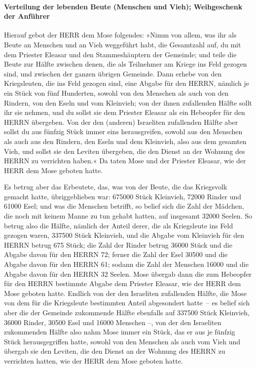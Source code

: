 \hypertarget{verteilung-der-lebenden-beute-menschen-und-vieh-weihgeschenk-der-anfuxfchrer}{%
\paragraph{Verteilung der lebenden Beute (Menschen und Vieh);
Weihgeschenk der
Anführer}\label{verteilung-der-lebenden-beute-menschen-und-vieh-weihgeschenk-der-anfuxfchrer}}

Hierauf gebot der HERR dem Mose folgendes:
»Nimm von allem, was ihr als Beute an Menschen und an
Vieh weggeführt habt, die Gesamtzahl auf, du mit dem Priester Eleasar
und den Stammeshäuptern der Gemeinde; und teile die Beute
zur Hälfte zwischen denen, die als Teilnehmer am Kriege ins Feld gezogen
sind, und zwischen der ganzen übrigen Gemeinde. Dann
erhebe von den Kriegsleuten, die ins Feld gezogen sind, eine Abgabe für
den HERRN, nämlich je ein Stück von fünf Hunderten, sowohl von den
Menschen als auch von den Rindern, von den Eseln und vom Kleinvieh;
von der ihnen zufallenden Hälfte sollt ihr sie nehmen,
und du sollst sie dem Priester Eleasar als ein Hebeopfer für den HERRN
übergeben. Von der den (anderen) Israeliten zufallenden
Hälfte aber sollst du aus fünfzig Stück immer eins herausgreifen, sowohl
aus den Menschen als auch aus den Rindern, den Eseln und dem Kleinvieh,
also aus dem gesamten Vieh, und sollst sie den Leviten übergeben, die
den Dienst an der Wohnung des HERRN zu verrichten haben.«
Da taten Mose und der Priester Eleasar, wie der HERR dem
Mose geboten hatte.

Es betrug aber das Erbeutete, das, was von der Beute, die
das Kriegsvolk gemacht hatte, übriggeblieben war: 675000 Stück
Kleinvieh, 72000 Rinder und 61000 Esel;
und was die Menschen betrifft, so belief sich die Zahl
der Mädchen, die noch mit keinem Manne zu tun gehabt hatten, auf
insgesamt 32000 Seelen. So betrug also die Hälfte,
nämlich der Anteil derer, die als Kriegsleute ins Feld gezogen waren,
337500 Stück Kleinvieh, und die Abgabe vom Kleinvieh für
den HERRN betrug 675 Stück; die Zahl der Rinder betrug
36000 Stück und die Abgabe davon für den HERRN 72; ferner
die Zahl der Esel 30500 und die Abgabe davon für den HERRN 61;
sodann die Zahl der Menschen 16000 und die Abgabe davon
für den HERRN 32 Seelen. Mose übergab dann die zum
Hebeopfer für den HERRN bestimmte Abgabe dem Priester Eleasar, wie der
HERR dem Mose geboten hatte. Endlich von der den
Israeliten zufallenden Hälfte, die Mose von dem für die Kriegsleute
bestimmten Anteil abgesondert hatte~-- es belief sich
aber die der Gemeinde zukommende Hälfte ebenfalls auf 337500 Stück
Kleinvieh, 36000 Rinder, 30500 Esel
und 16000 Menschen --, von der den
Israeliten zukommenden Hälfte also nahm Mose immer ein Stück, das er aus
je fünfzig Stück herausgegriffen hatte, sowohl von den Menschen als auch
vom Vieh und übergab sie den Leviten, die den Dienst an der Wohnung des
HERRN zu verrichten hatten, wie der HERR dem Mose geboten hatte.

